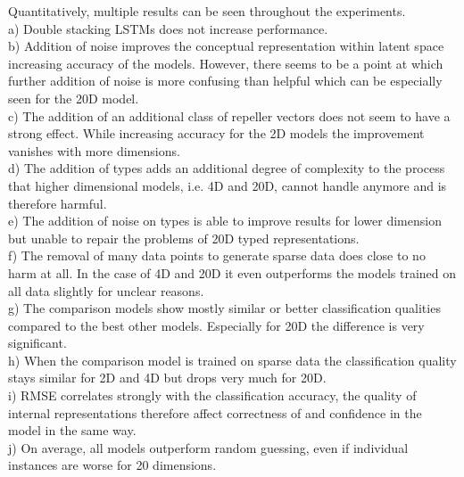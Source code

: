 Quantitatively, multiple results can be seen throughout the experiments. \\
a) Double stacking LSTMs does not increase performance.\\
b) Addition of noise improves the conceptual representation within latent space increasing accuracy of the models. However, there seems to be a point at which further addition of noise is more confusing than helpful which can be especially seen for the 20D model. \\
c) The addition of an additional class of repeller vectors does not seem to have a strong effect. While increasing accuracy for the 2D models the improvement vanishes with more dimensions. \\
d) The addition of types adds an additional degree of complexity to the process that higher dimensional models, i.e. 4D and 20D, cannot handle anymore and is therefore harmful. \\
e) The addition of noise on types is able to improve results for lower dimension but unable to repair the problems of 20D typed representations. \\
f) The removal of many data points to generate sparse data does close to no harm at all. In the case of 4D and 20D it even outperforms the models trained on all data slightly for unclear reasons. \\
g) The comparison models show mostly similar or better classification qualities compared to the best other models. Especially for 20D the difference is very significant. \\
h) When the comparison model is trained on sparse data the classification quality stays similar for 2D and 4D but drops very much for 20D. \\
i) RMSE correlates strongly with the classification accuracy, the quality of internal representations therefore affect correctness of and confidence in the model in the same way. \\
j) On average, all models outperform random guessing, even if individual instances are worse for 20 dimensions. \\

